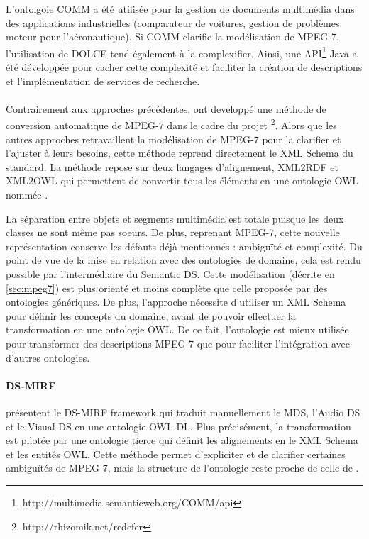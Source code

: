 L'ontolgoie COMM a été utilisée pour la gestion de documents multimédia dans des applications industrielles (comparateur de voitures, gestion de problèmes moteur pour l'aéronautique).
Si COMM clarifie la modélisation de MPEG-7, l'utilisation de DOLCE tend également à la complexifier.
Ainsi, une API\footnote{http://multimedia.semanticweb.org/COMM/api} Java a été développée pour cacher cette complexité et faciliter la création de descriptions et l'implémentation de services de recherche.



\paragraph{}
Contrairement aux approches précédentes, \cite{Garcia2005} ont developpé une méthode de conversion automatique de MPEG-7 dans le cadre du projet \footnote{http://rhizomik.net/redefer}.
Alors que les autres approches retravaillent la modélisation de MPEG-7 pour la clarifier et l'ajuster à leurs besoins, cette méthode reprend directement le XML Schema du standard.
La méthode repose sur deux langages d'alignement, XML2RDF et XML2OWL qui permettent de convertir tous les éléments en une ontologie OWL nommée .

La séparation entre objets et segments multimédia est totale puisque les deux classes ne sont même pas soeurs.
De plus, reprenant MPEG-7, cette nouvelle représentation conserve les défauts déjà mentionnés : ambiguïté et complexité.
Du point de vue de la mise en relation avec des ontologies de domaine, cela est rendu possible par l'intermédiaire du Semantic DS.
Cette modélisation (décrite en \ref{sec:mpeg7}) est plus orienté et moins complète que celle proposée par des ontologies génériques.
De plus, l'approche nécessite d'utiliser un XML Schema pour définir les concepts du domaine, avant de pouvoir effectuer la transformation en une ontologie OWL.
De ce fait, l'ontologie est mieux utilisée pour transformer des descriptions MPEG-7 que pour faciliter l'intégration avec d'autres ontologies.


\paragraph{DS-MIRF}
\cite{Tsinaraki2004a, Tsinaraki2007} présentent le DS-MIRF framework qui traduit manuellement le MDS, l'Audio DS et le Visual DS en une ontologie OWL-DL.
Plus précisément, la transformation est pilotée par une ontologie tierce qui définit les alignements en le XML Schema et les entités OWL.
Cette méthode permet d'expliciter et de clarifier certaines ambiguïtés de MPEG-7, mais la structure de l'ontologie reste proche de celle de .

